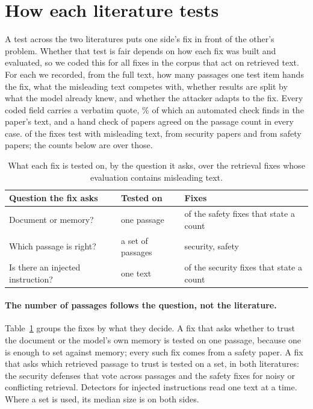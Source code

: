 \section{How each literature tests}
\label{sec:testing}

A test across the two literatures puts one side's fix in front of the
other's problem. Whether that test is fair depends on how each fix was built
and evaluated, so we coded this for all \NDesignFixes{} fixes in the corpus
that act on retrieved text. For each we recorded, from the full text, how
many passages one test item hands the fix, what the misleading text competes
with, whether results are split by what the model already knew, and whether
the attacker adapts to the fix. Every coded field carries a verbatim quote,
\PctDesignQuotes{}\% of which an automated check finds in the paper's text,
and a hand check of \NDesignHand{} papers agreed on the passage count in
every case. \NDesignInScope{} of the fixes test with misleading text,
\NDesignSec{} from security papers and \NDesignSaf{} from safety papers; the
counts below are over those.

\begin{table}[t]
\centering
\caption{What each fix is tested on, by the question it asks, over the
\NDesignInScope{} retrieval fixes whose evaluation contains misleading text.}
\label{tab:units}
\footnotesize
\begin{tabular}{@{}p{}p{}p{}@{}}
\toprule
\textbf{Question the fix asks} & \textbf{Tested on} & \textbf{Fixes} \\
\midrule
Document or memory? & one passage & \NDesignMemOne{} of the
  \NDesignMemCounted{} safety fixes that state a count \\
Which passage is right? & a set of passages & \NDesignSetSec{} security,
  \NDesignSetSaf{} safety \\
Is there an injected instruction? & one text & \NDesignInstrOne{} of the
  \NDesignInstrCounted{} security fixes that state a count \\
\bottomrule
\end{tabular}
\end{table}

\paragraph{The number of passages follows the question, not the literature.}
Table~\ref{tab:units} groups the fixes by what they decide. A fix that asks
whether to trust the document or the model's own memory is tested on one
passage, because one is enough to set against memory; every such fix comes
from a safety paper. A fix that asks which retrieved passage to trust is
tested on a set, in both literatures: the security defenses that vote across
passages and the safety fixes for noisy or conflicting retrieval. Detectors
for injected instructions read one text at a time. Where a set is used, its
median size is \NDesignMedianK{} on both sides.

